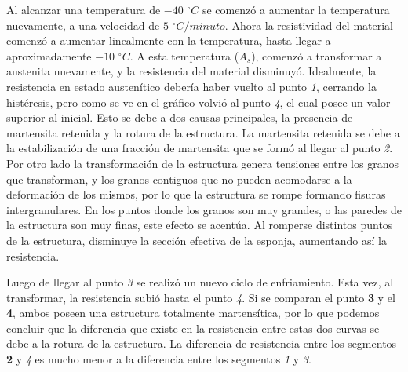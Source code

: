 \documentclass[a4paper,12pt,fleqn,twoside,openany]{book}
\begin{document}
 Al alcanzar una temperatura de $-40$ $^\circ C$ se comenzó a aumentar la temperatura nuevamente, a una velocidad de $5$ $^\circ C/minuto$. Ahora la resistividad del material comenzó a aumentar linealmente con la temperatura, hasta llegar a aproximadamente $-10$ $^\circ C$. A esta temperatura ($A_s$), comenzó a transformar a austenita nuevamente, y la resistencia del material disminuyó. Idealmente, la resistencia en estado austenítico debería haber vuelto al punto \textit{1}, cerrando la histéresis, pero como se ve en el gráfico volvió al punto \textit{4}, el cual posee un valor superior al inicial. Esto se debe a dos causas principales, la presencia de martensita retenida y la rotura de la estructura. La martensita retenida se debe a la estabilización de una fracción de martensita que se formó al llegar al punto \textit{2}. Por otro lado la transformación de la estructura genera tensiones entre los granos que transforman, y los granos contiguos que no pueden acomodarse a la deformación de los mismos, por lo que la estructura se rompe formando fisuras intergranulares. En los puntos donde los granos son muy grandes, o las paredes de la estructura son muy finas, este efecto se acentúa. Al romperse distintos puntos de la estructura, disminuye la sección efectiva de la esponja, aumentando así la resistencia.

 Luego de llegar al punto \textit{3} se realizó un nuevo ciclo de enfriamiento. Esta vez, al transformar, la resistencia subió hasta el punto \textit{4}. Si se comparan el punto \textbf{3} y el \textbf{4}, ambos poseen una estructura totalmente martensítica, por lo que podemos concluir que la diferencia que existe en la resistencia entre estas dos curvas se debe a la rotura de la estructura. La diferencia de resistencia entre los segmentos \textbf{2} y \textit{4} es mucho menor a la diferencia entre los segmentos \textit{1} y \textit{3}. 
%  
%  
 
\end{document}
